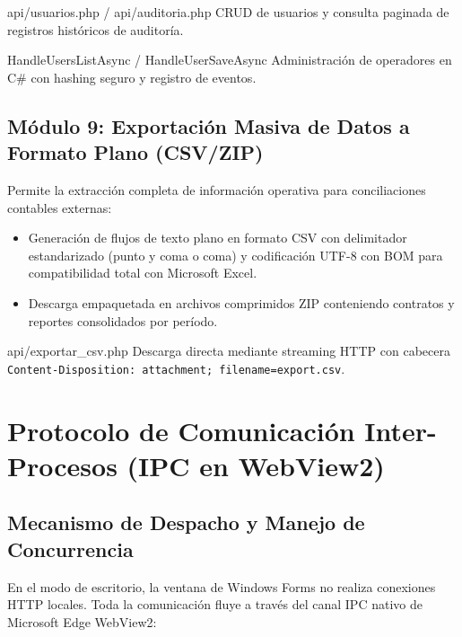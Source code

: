 \documentclass[11pt,a4paper,openany]{report}
\begin{document}
\begin{apibox}{api/usuarios.php / api/auditoria.php}
    CRUD de usuarios y consulta paginada de registros históricos de auditoría.
\end{apibox}

\begin{methodbox}{HandleUsersListAsync / HandleUserSaveAsync}
    Administración de operadores en C\# con hashing seguro y registro de eventos.
\end{methodbox}

\electricsep

\section{Módulo 9: Exportación Masiva de Datos a Formato Plano (CSV/ZIP)}

Permite la extracción completa de información operativa para conciliaciones contables externas:
\begin{itemize}[leftmargin=1.5em]
    \item Generación de flujos de texto plano en formato CSV con delimitador estandarizado (punto y coma o coma) y codificación UTF-8 con BOM para compatibilidad total con Microsoft Excel.
    \item Descarga empaquetada en archivos comprimidos ZIP conteniendo contratos y reportes consolidados por período.
\end{itemize}

\begin{apibox}{api/exportar\_csv.php}
    Descarga directa mediante streaming HTTP con cabecera \texttt{Content-Disposition: attachment; filename=export.csv}.
\end{apibox}

\chapter{Protocolo de Comunicación Inter-Procesos (IPC en WebView2)}

\section{Mecanismo de Despacho y Manejo de Concurrencia}

En el modo de escritorio, la ventana de Windows Forms no realiza conexiones HTTP locales. Toda la comunicación fluye a través del canal IPC nativo de Microsoft Edge WebView2:
\end{document}
